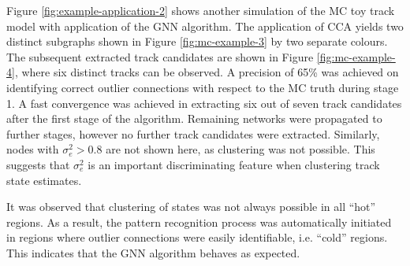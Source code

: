 Figure \ref{fig:example-application-2} shows another simulation of the MC toy track model with application of the GNN algorithm. The application of CCA yields two distinct subgraphs shown in Figure \ref{fig:mc-example-3} by two separate colours. The subsequent extracted track candidates are shown in Figure \ref{fig:mc-example-4}, where six distinct tracks can be observed. A precision of 65\% was achieved on identifying correct outlier connections with respect to the MC truth during stage 1. A fast convergence was achieved in extracting six out of seven track candidates after the first stage of the algorithm. Remaining networks were propagated to further stages, however no further track candidates were extracted. Similarly, nodes with $\sigma_e^2 > 0.8$ are not shown here, as clustering was not possible. This suggests that $\sigma_{e}^{2}$ is an important discriminating feature when clustering track state estimates. 

It was observed that clustering of states was not always possible in all ``hot'' regions. As a result, the pattern recognition process was automatically initiated in regions where outlier connections were easily identifiable, i.e. ``cold'' regions. This indicates that the GNN algorithm behaves as expected. 


